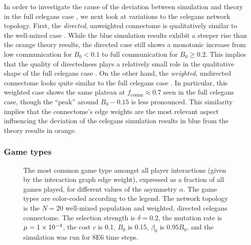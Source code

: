 \documentclass[pdflatex,lineno,referee,sn-mathphys-ay]{sn-jnl}
\begin{document}
In order to investigate the cause of the deviation
between simulation and theory
in the full \gls{celegans} case ,
we next look at variations to the \gls{celegans} network topology.
First, the \emph{directed}, unweighted connectome
is qualitatively similar to the well-mixed case
.
While the blue simulation results exhibit a steeper rise
than the orange theory results,
the directed case still shows a monotonic increase
from low communication for $B_0 < 0.1$
to full communication for $B_0 \ge 0.2$.
This implies that the quality of directedness
plays a relatively small role in the qualitative shape
of the full \gls{celegans} case .
On the other hand,
the \emph{weighted}, undirected connectome
looks quite similar to the full \gls{celegans} case
.
In particular, this weighted case
shows the same plateau at $f_{\text{comm}} \approx 0.7$
seen in the full \gls{celegans} case,
though the ``peak'' around $B_0 - 0.15$ is less pronounced.
This similarity implies that the connectome's edge weights
are the most relevant aspect influencing the deviation
of the \gls{celegans} 
simulation results in blue from the theory results in orange.

\subsubsection{Game types}
\begin{figure}
  \centering
  
  \caption{
    The most common game type amongst all player interactions
    (given by the interaction graph edge weight),
    expressed as a fraction of all games played,
    for different values of the asymmetry $\alpha$.
    The game types are color-coded according to the legend.
    The network topology is the
    $N=20$ well-mixed population
    and
    weighted, directed \gls{celegans} connectome.
    The selection strength is $\delta=0.2$,
    the mutation rate is $\mu=\num{1E-4}$,
    the cost $c$ is \num{0.1},
    $B_0$ is \num{0.15},
    $\beta_0$ is $\num{0.95} B_0$,
    and the simulation was run for \num{8E6} time steps.
  }
  \label{fig:game-type}
\end{figure}
\end{document}
